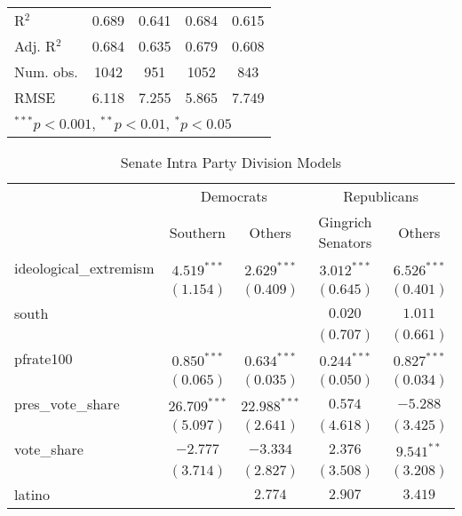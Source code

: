 \documentclass[12pt]{article}
\begin{document}
\begin{table}
\begin{center}
\begin{tabular}{l c c c c }
			\hline
			R$^2$                  & 0.689          & 0.641           & 0.684          & 0.615         \\
			Adj. R$^2$             & 0.684          & 0.635           & 0.679          & 0.608         \\
			Num. obs.              & 1042           & 951             & 1052           & 843           \\
			RMSE                   & 6.118          & 7.255           & 5.865          & 7.749         \\
			\hline
			\multicolumn{5}{l}{\scriptsize{$^{***}p<0.001$, $^{**}p<0.01$, $^*p<0.05$}}
		\end{tabular}
	\end{center}
\end{table}

\begin{table}
	\begin{center}
		\caption{Senate Intra Party Division Models}
		\begin{tabular}{l c c c c }
			\hline
			& \multicolumn{2}{c}{Democrats} & \multicolumn{2}{c}{Republicans} \\
			\cline{2-5}
			& Southern  & Others & Gingrich Senators & Others \\
			\hline
			ideological\_extremism & $4.519^{***}$  & $2.629^{***}$  & $3.012^{***}$  & $6.526^{***}$ \\
			& $(1.154)$      & $(0.409)$      & $(0.645)$      & $(0.401)$     \\
			south                  &                &                & $0.020$        & $1.011$       \\
			&                &                & $(0.707)$      & $(0.661)$     \\
			pfrate100              & $0.850^{***}$  & $0.634^{***}$  & $0.244^{***}$  & $0.827^{***}$ \\
			& $(0.065)$      & $(0.035)$      & $(0.050)$      & $(0.034)$     \\
			pres\_vote\_share      & $26.709^{***}$ & $22.988^{***}$ & $0.574$        & $-5.288$      \\
			& $(5.097)$      & $(2.641)$      & $(4.618)$      & $(3.425)$     \\
			vote\_share            & $-2.777$       & $-3.334$       & $2.376$        & $9.541^{**}$  \\
			& $(3.714)$      & $(2.827)$      & $(3.508)$      & $(3.208)$     \\
			latino                 &                & $2.774$        & $2.907$        & $3.419$       \\

\end{tabular}
\end{center}
\end{table}
\end{document}
